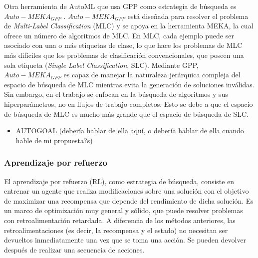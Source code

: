 Otra herramienta de AutoML que usa GPP como estrategia de búsqueda es $Auto-MEKA_{GPP}$ \cite{de2018automated}. $Auto-MEKA_{GPP}$ está diseñada para resolver el problema de \textit{Multi-Label Classification} (MLC) y se apoya en la herramienta MEKA, la cual ofrece un número de algoritmos de MLC. En MLC, cada ejemplo puede ser asociado con una o más etiquetas de clase, lo que hace los problemas de MLC más difíciles que los problemas de clasificación convencionales, que poseen una sola etiqueta (\textit{Single Label Classification}, SLC). Mediante GPP, $Auto-MEKA_{GPP}$ es capaz de manejar la naturaleza jerárquica compleja del espacio de búsqueda de MLC mientras evita la generación de soluciones inválidas. Sin embargo, en el trabajo se enfocan en la búsqueda de algoritmos y sus hiperparámetros, no en flujos de trabajo completos. Esto se debe a que el espacio de búsqueda de MLC es mucho más grande que el espacio de búsqueda de SLC.

\begin{itemize}
	\item AUTOGOAL (debería hablar de ella aquí, o debería hablar de ella cuando hable de mi propuesta?s)
\end{itemize}

\subsubsection{Aprendizaje por refuerzo}


El aprendizaje por refuerzo (RL), como estrategia de búsqueda, consiste en entrenar un agente que realiza modificaciones sobre una solución con el objetivo de maximizar una recompensa que depende del rendimiento de dicha solución. Es un marco de optimización muy general y sólido, que puede resolver problemas con retroalimentación retardada. A diferencia de los métodos anteriores, las retroalimentaciones (es decir, la recompensa y el estado) no necesitan ser devueltos inmediatamente una vez que se toma una acción. Se pueden devolver después de realizar una secuencia de acciones. 

